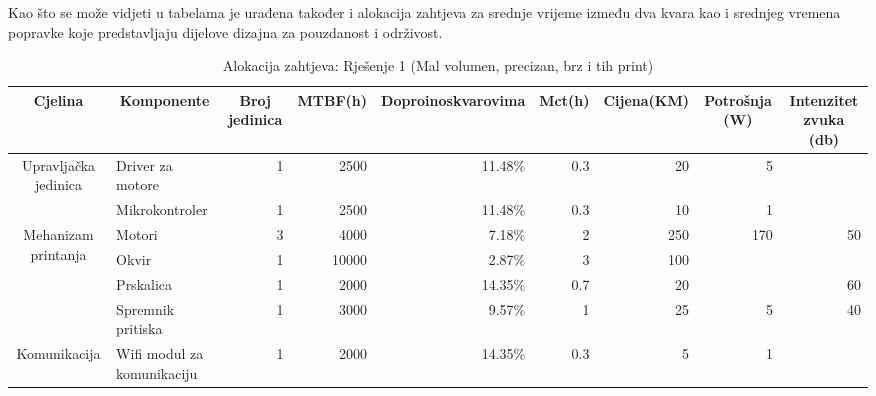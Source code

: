 \documentclass[12pt]{article}
\begin{document}
Kao što se može vidjeti u tabelama je urađena također i alokacija zahtjeva za srednje vrijeme između dva kvara kao i  srednjeg vremena popravke koje predstavljaju dijelove dizajna za pouzdanost i održivost.
\begin{landscape}


\begin{table}[]
\scriptsize
  \centering
  \caption{Alokacija zahtjeva: Rješenje 1 (Mal volumen, precizan, brz i tih print)}
    \begin{tabular}{ccccccccc}

    \midrule
    Cjelina & Komponente & Broj jedinica & MTBF(h) & \multicolumn{1}{p{5.215em}}{Doproinos\newline{}kvarovima} & Mct(h) & Cijena(KM) & Potrošnja (W) & Intenzitet zvuka (db) \\
    \midrule
    \multirow{2}[4]{*}{Upravljačka jedinica} & \multicolumn{1}{l}{Driver za motore} & \multicolumn{1}{r}{1} & \multicolumn{1}{r}{2500} & \multicolumn{1}{r}{11.48\%} & \multicolumn{1}{r}{0.3} & \multicolumn{1}{r}{20} & \multicolumn{1}{r}{5} &  \\
\cmidrule{5-5}          & \multicolumn{1}{l}{Mikrokontroler} & \multicolumn{1}{r}{1} & \multicolumn{1}{r}{2500} & \multicolumn{1}{r}{11.48\%} & \multicolumn{1}{r}{0.3} & \multicolumn{1}{r}{10} & \multicolumn{1}{r}{1} &  \\
    \midrule
    \multirow{4}[8]{*}{Mehanizam printanja} & \multicolumn{1}{l}{Motori} & \multicolumn{1}{r}{3} & \multicolumn{1}{r}{4000} & \multicolumn{1}{r}{7.18\%} & \multicolumn{1}{r}{2} & \multicolumn{1}{r}{250} & \multicolumn{1}{r}{170} & \multicolumn{1}{r}{50} \\
\cmidrule{5-5}          & \multicolumn{1}{l}{Okvir} & \multicolumn{1}{r}{1} & \multicolumn{1}{r}{10000} & \multicolumn{1}{r}{2.87\%} & \multicolumn{1}{r}{3} & \multicolumn{1}{r}{100} &       &  \\
\cmidrule{5-5}          & \multicolumn{1}{l}{Prskalica} & \multicolumn{1}{r}{1} & \multicolumn{1}{r}{2000} & \multicolumn{1}{r}{14.35\%} & \multicolumn{1}{r}{0.7} & \multicolumn{1}{r}{20} &       & \multicolumn{1}{r}{60} \\
\cmidrule{5-5}          & \multicolumn{1}{l}{Spremnik pritiska} & \multicolumn{1}{r}{1} & \multicolumn{1}{r}{3000} & \multicolumn{1}{r}{9.57\%} & \multicolumn{1}{r}{1} & \multicolumn{1}{r}{25} & \multicolumn{1}{r}{5} & \multicolumn{1}{r}{40} \\
    \midrule
    \multirow{2}[4]{*}{Komunikacija} & \multicolumn{1}{l}{Wifi modul za komunikaciju} & \multicolumn{1}{r}{1} & \multicolumn{1}{r}{2000} & \multicolumn{1}{r}{14.35\%} & \multicolumn{1}{r}{0.3} & \multicolumn{1}{r}{5} & \multicolumn{1}{r}{1} &  \\

\end{tabular}
\end{table}
\end{landscape}
\end{document}
